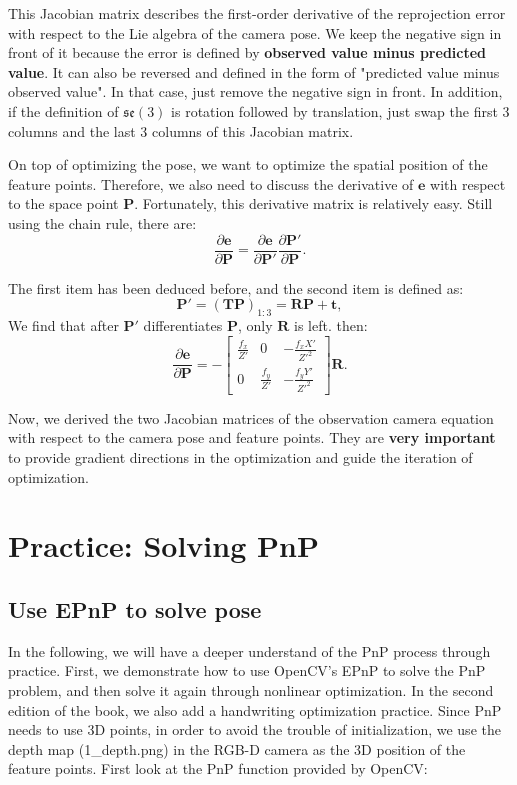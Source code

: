 This Jacobian matrix describes the first-order derivative of the reprojection error with respect to the Lie algebra of the camera pose. We keep the negative sign in front of it because the error is defined by \textbf{observed value minus predicted value}. It can also be reversed and defined in the form of "predicted value minus observed value". In that case, just remove the negative sign in front. In addition, if the definition of $\mathfrak{se}(3)$ is rotation followed by translation, just swap the first 3 columns and the last 3 columns of this Jacobian matrix.

On top of optimizing the pose, we want to optimize the spatial position of the feature points. Therefore, we also need to discuss the derivative of $\bm{e}$ with respect to the space point $\bm{P}$. Fortunately, this derivative matrix is relatively easy. Still using the chain rule, there are:
\begin{equation}
\frac{{\partial \bm{e}}}{{\partial \bm{P} }} = \frac{{\partial \bm{e}}}{{\partial \bm{P}'}}\frac{{\partial \bm{P}'}}{{\partial \bm{P} }}.
\end{equation}

The first item has been deduced before, and the second item is defined as:
\[
\bm{P}'= (\bm{T} \bm{P})_{1:3} = \bm{R} \bm{P} + \bm{t},
\]
We find that after $\bm{P}'$ differentiates $\bm{P}$, only $\bm{R}$ is left. then:
\begin{equation}
\label{eq:jacob-uv2P}
\frac{{\partial \bm{e}}}{{\partial \bm{P} }} = -\left[ 
\begin{array}{*{20}{c}}
	\frac{f_x}{Z'} & 0 &- \frac{f_x X'}{Z'^2} \\
	0 & \frac{f_y}{Z'} & - \frac{f_y Y'}{Z'^2}
\end{array} \right] \bm{R}.
\end{equation}

Now, we derived the two Jacobian matrices of the observation camera equation with respect to the camera pose and feature points. They are \textbf{very important} to provide gradient directions in the optimization and guide the iteration of optimization.

\section{Practice: Solving PnP}
\subsection{Use EPnP to solve pose}
In the following, we will have a deeper understand of the PnP process through practice. First, we demonstrate how to use OpenCV's EPnP to solve the PnP problem, and then solve it again through nonlinear optimization. In the second edition of the book, we also add a handwriting optimization practice. Since PnP needs to use 3D points, in order to avoid the trouble of initialization, we use the depth map (1_depth.png) in the RGB-D camera as the 3D position of the feature points. First look at the PnP function provided by OpenCV:

